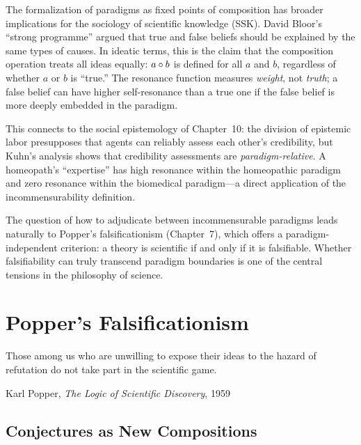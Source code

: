\begin{remark}
The formalization of paradigms as fixed points of composition has broader
implications for the sociology of scientific knowledge (SSK). David Bloor's
``strong programme'' argued that true and false beliefs should be explained by the
same types of causes. In ideatic terms, this is the claim that the composition
operation treats all ideas equally: $a \circ b$ is defined for all $a$ and $b$,
regardless of whether $a$ or $b$ is ``true.'' The resonance function measures
\emph{weight}, not \emph{truth}; a false belief can have higher self-resonance
than a true one if the false belief is more deeply embedded in the paradigm.

This connects to the social epistemology of Chapter~10: the division of epistemic
labor presupposes that agents can reliably assess each other's credibility, but
Kuhn's analysis shows that credibility assessments are \emph{paradigm-relative}.
A homeopath's ``expertise'' has high resonance within the homeopathic paradigm
and zero resonance within the biomedical paradigm---a direct application of the
incommensurability definition.

The question of how to adjudicate between incommensurable paradigms leads
naturally to Popper's falsificationism (Chapter~7), which offers a paradigm-independent
criterion: a theory is scientific if and only if it is falsifiable. Whether
falsifiability can truly transcend paradigm boundaries is one of the central
tensions in the philosophy of science.
\end{remark}


\chapter{Popper's Falsificationism}
\label{ch:popper}

\epigraph{Those among us who are unwilling to expose their ideas to the hazard of refutation do not take part in the scientific game.}{Karl Popper, \textit{The Logic of Scientific Discovery}, 1959}

\section{Conjectures as New Compositions}

